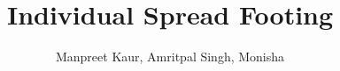 \title{Individual Spread Footing}
\author{Manpreet Kaur, Amritpal Singh, Monisha}
\begin{titlepage}
     \maketitle
    \tableofcontents
    \listoffigures
    \listofcharts
    \listoftables
\end{titlepage}
